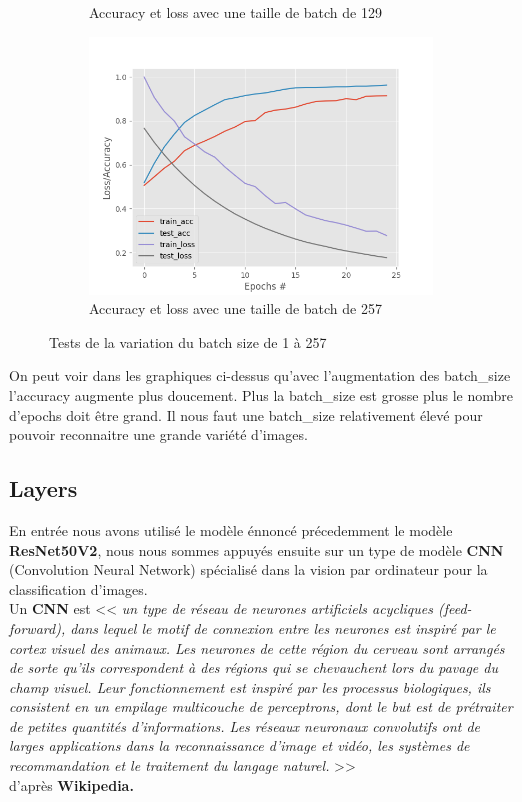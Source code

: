 \begin{figure}[H]
\begin{subfigure}[b]{0.4\linewidth}
    \caption{Accuracy et loss avec une taille de batch de 129}
  \end{subfigure}
  \begin{subfigure}[b]{0.4\linewidth}
    \includegraphics[width=\linewidth]{resources/loss-accuracy-25-257.png}
    \caption{Accuracy et loss avec une taille de batch de 257}
  \end{subfigure}
  \caption{Tests de la variation du batch size de 1 à 257}
  \label{fig:coffee}
\end{figure}

On peut voir dans les graphiques ci-dessus qu’avec l’augmentation des batch\_size l’accuracy augmente plus doucement. Plus la batch\_size est grosse plus le nombre d'epochs doit être grand. Il nous faut une batch\_size relativement élevé pour pouvoir reconnaitre une grande variété d’images. 

\clearpage
\subsection{Layers}

En entrée nous avons utilisé le modèle énnoncé précedemment le modèle \textbf{ResNet50V2}, nous nous sommes appuyés ensuite sur un type de modèle \textbf{CNN} (Convolution Neural Network) spécialisé dans la vision par ordinateur pour la classification d'images. \\

Un \textbf{CNN} est << \textit{un type de réseau de neurones artificiels acycliques (feed-forward), dans lequel le motif de connexion entre les neurones est inspiré par le cortex visuel des animaux. Les neurones de cette région du cerveau sont arrangés de sorte qu'ils correspondent à des régions qui se chevauchent lors du pavage du champ visuel. Leur fonctionnement est inspiré par les processus biologiques, ils consistent en un empilage multicouche de perceptrons, dont le but est de prétraiter de petites quantités d'informations. Les réseaux neuronaux convolutifs ont de larges applications dans la reconnaissance d'image et vidéo, les systèmes de recommandation et le traitement du langage naturel.} >> \\d'après \textbf{Wikipedia.} 


